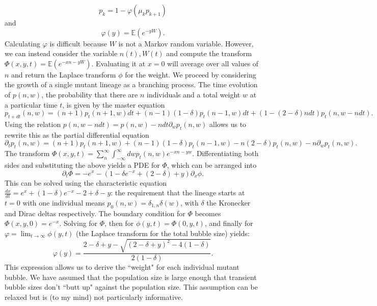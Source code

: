 \documentclass[10pt]{revtex4}
\begin{document}
\begin{equation}
p_k = 1-\varphi(\mu_k p_{k+1})
\end{equation}
and
\begin{equation}
\varphi(y) = \mathbb{E}(e^{-yW}).
\end{equation}
Calculating $\varphi$ is difficult because $W$ is not a Markov random variable. 
However, we can instead consider the variable $n(t), W(t)$ and compute the transform $\Phi (x,y,t) = \mathbb{E}(e^{-xn-yW})$.
Evaluating it at $x=0$ will average over all values of $n$ and return the Laplace transform $\phi$ for the weight.
We proceed by considering the growth of a single mutant lineage as a branching process.
The time evolution of $p(n,w)$, the probability that there are $n$ individuals and a total weight $w$ at a particular time $t$, is given by the master equation
\begin{equation}
p_{t+dt}(n,w) = (n+1)p_t(n+1,w)dt + (n-1)(1-\delta)p_t(n-1,w)dt + (1-(2-\delta)ndt)p_t(n,w-ndt).
\end{equation}
Using the relation $p(n,w-ndt) = p(n,w)-ndt\partial_w p_t(n,w)$ allows us to rewrite this as the partial differential equation
\begin{equation}
\partial_t p_t (n,w) = (n+1)p_t(n+1,w) + (n-1)(1-\delta) p_t(n-1,w) - n(2-\delta)p_t(n,w)-n\partial_w p_t(n,w).
\end{equation}
The transform $\Phi(x,y,t) = \sum_n^\infty \int_{-\infty}^\infty dw p_t(n,w) e^{-xn-yw}$.
Differentiating both sides and substituting the above yields a PDE for $\Phi$, which can be arranged into
\begin{equation}
\partial_t \Phi = -e^x - (1-\delta e^{-x} + (2-\delta) + y)\partial_x \phi .
\end{equation}
This can be solved using the characteristic equation $\frac{dx}{dt} = e^x + (1-\delta)e^{-x} - 2+\delta-y$: the requirement that the lineage starts at $t=0$ with one individual means $p_0(n,w) = \delta_{1,n} \delta (w)$, with $\delta$ the Kronecker and Dirac deltas respectively.
The boundary condition for $\Phi$ becomes $\Phi(x,y,0) = e^{-x}$. Solving for $\Phi$, then for $\phi(y,t) = \Phi(0,y,t)$, and finally for $\varphi = \lim_{t\to \infty} \phi (y,t)$ (the Laplace transform for the total bubble size) yields:
\begin{equation}
\varphi(y) = \frac{2-\delta+y-\sqrt{(2-\delta+y)^2 - 4(1-\delta)}}{2(1-\delta)}.
\end{equation}
This expression allows us to derive the ``weight" for each individual mutant bubble.
We have assumed that the population size is large enough that transient bubble sizes don't ``butt up" against the population size. This assumption can be relaxed but is (to my mind) not particularly informative.
\end{document}
